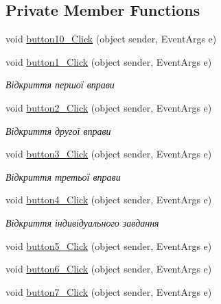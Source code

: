 \subsection*{Private Member Functions}
\begin{DoxyCompactItemize}
\item 
void \hyperlink{class__7___doroshenko__forms2__is52_1_1_form1_acb4571cf35bccb4d8524ed4efd9d6f69}{button10\+\_\+\+Click} (object sender, Event\+Args e)
\item 
void \hyperlink{class__7___doroshenko__forms2__is52_1_1_form1_a607baff215aa451ab201b1afe65c9669}{button1\+\_\+\+Click} (object sender, Event\+Args e)
\begin{DoxyCompactList}\small\item\em Відкриття першої вправи \end{DoxyCompactList}\item 
void \hyperlink{class__7___doroshenko__forms2__is52_1_1_form1_a396c65df583a69ba0692af2fb86ea43b}{button2\+\_\+\+Click} (object sender, Event\+Args e)
\begin{DoxyCompactList}\small\item\em Відкриття другої вправи \end{DoxyCompactList}\item 
void \hyperlink{class__7___doroshenko__forms2__is52_1_1_form1_a2057eaec9016139eb5b5dca1ccb19f25}{button3\+\_\+\+Click} (object sender, Event\+Args e)
\begin{DoxyCompactList}\small\item\em Відкриття третьої вправи \end{DoxyCompactList}\item 
void \hyperlink{class__7___doroshenko__forms2__is52_1_1_form1_aed668b01be973700ab8589f694f9e0b9}{button4\+\_\+\+Click} (object sender, Event\+Args e)
\begin{DoxyCompactList}\small\item\em Відкриття індивідуального завдання \end{DoxyCompactList}\item 
void \hyperlink{class__7___doroshenko__forms2__is52_1_1_form1_a37aec70c8f5b1bf73b5e91b5f0311817}{button5\+\_\+\+Click} (object sender, Event\+Args e)
\item 
void \hyperlink{class__7___doroshenko__forms2__is52_1_1_form1_a523f7cc7c91fa861c164b2f57712362d}{button6\+\_\+\+Click} (object sender, Event\+Args e)
\item 
void \hyperlink{class__7___doroshenko__forms2__is52_1_1_form1_a08472aa69ab87aa28be496f75ef61c8f}{button7\+\_\+\+Click} (object sender, Event\+Args e)

\end{DoxyCompactItemize}
